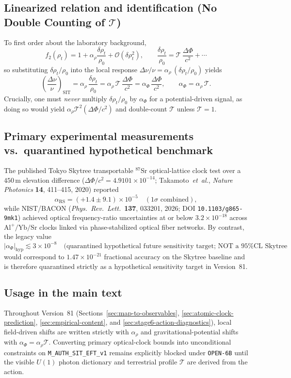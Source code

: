\subsection{Linearized relation and identification (No Double Counting of $\mathcal{T}$)}
To first order about the laboratory background,
\[
f_2(\rho_t) = 1 + \alpha_\rho \frac{\delta \rho_t}{\rho_0} + \mathcal{O}(\delta \rho_t^{2}), \qquad
\frac{\delta \rho_t}{\rho_0} = \mathcal{T}\,\frac{\Delta \Phi}{c^2} + \cdots
\]
so substituting $\delta\rho_t/\rho_0$ into the local response $\Delta\nu/\nu = \alpha_\rho\,(\delta\rho_t/\rho_0)$ yields
\[
\left(\frac{\Delta\nu}{\nu}\right)_{\mathrm{SIT}}
= \alpha_\rho\,\frac{\delta\rho_t}{\rho_0}
= \alpha_\rho\,\mathcal{T}\,\frac{\Delta\Phi}{c^2}
= \alpha_\Phi\,\frac{\Delta\Phi}{c^2},
\qquad
\alpha_\Phi = \alpha_\rho\,\mathcal{T}.
\]
Crucially, one must \emph{never} multiply $\delta\rho_t/\rho_0$ by $\alpha_\Phi$ for a potential-driven signal, as doing so would yield $\alpha_\rho\mathcal{T}^2(\Delta\Phi/c^2)$ and double-count $\mathcal{T}$ unless $\mathcal{T} = 1$.

\subsection{Primary experimental measurements vs.\ quarantined hypothetical benchmark}
The published Tokyo Skytree transportable $^{87}\mathrm{Sr}$ optical-lattice clock test over a $450\,\mathrm{m}$ elevation difference ($\Delta\Phi/c^2 = 4.9101\times 10^{-14}$; Takamoto~\emph{et~al.}, \emph{Nature Photonics} \textbf{14}, 411--415, 2020) reported
\[
\alpha_{\mathrm{RS}} = (+1.4 \pm 9.1) \times 10^{-5} \quad (1\sigma\text{ combined}),
\]
while NIST/BACON (\emph{Phys.\ Rev.\ Lett.}\ \textbf{137}, 033201, 2026; DOI \texttt{10.1103/g865-9mk1}) achieved optical frequency-ratio uncertainties at or below $3.2\times 10^{-18}$ across $\mathrm{Al}^+/\mathrm{Yb}/\mathrm{Sr}$ clocks linked via phase-stabilized optical fiber networks. By contrast, the legacy value
\[
|\alpha_\Phi|_{\mathrm{hyp}} \lesssim 3 \times 10^{-8} \quad \text{(quarantined hypothetical future sensitivity target; NOT a 95\% CL Skytree bound)}
\]
would correspond to $1.47\times 10^{-21}$ fractional accuracy on the Skytree baseline and is therefore quarantined strictly as a hypothetical sensitivity target in Version~81.

\subsection{Usage in the main text}
Throughout Version~81 (Sections~\ref{sec:map-to-observables}, \ref{sec:atomic-clock-prediction}, \ref{sec:empirical-content}, and \ref{sec:stage6-action-diagnostics}), local field-driven shifts are written strictly with $\alpha_\rho$ and gravitational-potential shifts with $\alpha_\Phi = \alpha_\rho\mathcal{T}$. Converting primary optical-clock bounds into unconditional constraints on \texttt{M\_AUTH\_SIT\_EFT\_v1} remains explicitly blocked under \texttt{OPEN-6B} until the visible $U(1)$ photon dictionary and terrestrial profile $\mathcal{T}$ are derived from the action.

